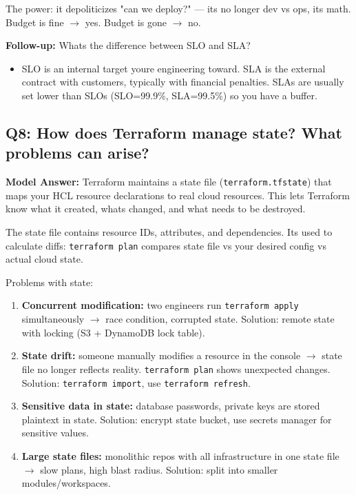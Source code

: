 \documentclass[11pt]{article}
\providecommand{\tightlist}{\setlength{\itemsep}{1pt}\setlength{\parskip}{0pt}}
\begin{document}
The power: it depoliticizes "can we deploy?" --- it\textquotesingle s no longer dev vs ops, it\textquotesingle s math. Budget is fine \(\rightarrow\) yes. Budget is gone \(\rightarrow\) no.

\textbf{Follow-up:} What\textquotesingle s the difference between SLO and SLA?

\begin{itemize}
\tightlist
\item
  SLO is an internal target you\textquotesingle re engineering toward. SLA is the external contract with customers, typically with financial penalties. SLAs are usually set lower than SLOs (SLO=99.9\%, SLA=99.5\%) so you have a buffer.
\end{itemize}

\subsection{Q8: How does Terraform manage state? What problems can arise?}\label{q8-how-does-terraform-manage-state-what-problems-can-arise}

\textbf{Model Answer:}
Terraform maintains a state file (\texttt{terraform.tfstate}) that maps your HCL resource declarations to real cloud resources. This lets Terraform know what it created, what\textquotesingle s changed, and what needs to be destroyed.

The state file contains resource IDs, attributes, and dependencies. It\textquotesingle s used to calculate diffs: \texttt{terraform\ plan} compares state file vs your desired config vs actual cloud state.

Problems with state:

\begin{enumerate}
\def\labelenumi{\arabic{enumi}.}
\tightlist
\item
  \textbf{Concurrent modification:} two engineers run \texttt{terraform\ apply} simultaneously \(\rightarrow\) race condition, corrupted state. Solution: remote state with locking (S3 + DynamoDB lock table).
\item
  \textbf{State drift:} someone manually modifies a resource in the console \(\rightarrow\) state file no longer reflects reality. \texttt{terraform\ plan} shows unexpected changes. Solution: \texttt{terraform\ import}, use \texttt{terraform\ refresh}.
\item
  \textbf{Sensitive data in state:} database passwords, private keys are stored plaintext in state. Solution: encrypt state bucket, use secrets manager for sensitive values.
\item
  \textbf{Large state files:} monolithic repos with all infrastructure in one state file \(\rightarrow\) slow plans, high blast radius. Solution: split into smaller modules/workspaces.
\end{enumerate}
\end{document}
